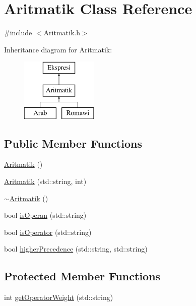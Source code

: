 \hypertarget{class_aritmatik}{}\section{Aritmatik Class Reference}
\label{class_aritmatik}


{\ttfamily \#include $<$Aritmatik.\+h$>$}

Inheritance diagram for Aritmatik\+:\begin{figure}[H]
\begin{center}
\leavevmode
\includegraphics[height=3.000000cm]{class_aritmatik}
\end{center}
\end{figure}
\subsection*{Public Member Functions}
\begin{DoxyCompactItemize}
\item 
\hyperlink{class_aritmatik_aa7da5dc54ef0b249411dcd39def1cd39}{Aritmatik} ()
\item 
\hyperlink{class_aritmatik_ab399b33108b9a947b3ceb4b980c17949}{Aritmatik} (std\+::string, int)
\item 
\hyperlink{class_aritmatik_a418c3d95a5648adb083cacb09d63f0aa}{$\sim$\+Aritmatik} ()
\item 
bool \hyperlink{class_aritmatik_ad3bebd263fb4d94e850848c282f80d6b}{is\+Operan} (std\+::string)
\item 
bool \hyperlink{class_aritmatik_a22df02b3a845fd0af3e1bae28121ba99}{is\+Operator} (std\+::string)
\item 
bool \hyperlink{class_aritmatik_a2bdb89adcf3b187382a40f3c66e8b649}{higher\+Precedence} (std\+::string, std\+::string)
\end{DoxyCompactItemize}
\subsection*{Protected Member Functions}
\begin{DoxyCompactItemize}
\item 
int \hyperlink{class_aritmatik_acb650d44adc6254fb3e0f027838af2db}{get\+Operator\+Weight} (std\+::string)
\end{DoxyCompactItemize}
